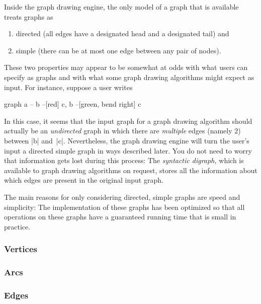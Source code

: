 Inside the graph drawing engine, the only model of a graph that is 
available treats graphs as
\begin{enumerate}
\item directed (all edges have a designated head and a designated
  tail) and
\item simple (there can be at most one edge between any pair of
  nodes). 
\end{enumerate}
These two properties may appear to be somewhat at odds with what users
can specify as graphs and with what some graph drawing algorithms
might expect as input. For instance, suppose a user writes
\begin{codeexample}
graph { a -- b --[red] c, b --[green, bend right] c }
\end{codeexample}
In this case, it seems that the input graph for a graph drawing
algorithm should actually be an \emph{undirected} graph in which there
are \emph{multiple} edges (namely $2$) between |b| and~|c|.
Nevertheless, the graph drawing engine will turn the user's input a
directed simple graph in ways described later. You do not need to
worry that information gets lost during this process: The
\emph{syntactic digraph,} which is available to graph drawing
algorithms on request, stores all the information about which edges
are present in the original input graph.

The main reasons for only considering directed, simple graphs are speed
and simplicity: The implementation of these graphs has been optimized so
that all operations on these graphs have a guaranteed running time
that is small in practice. 


\subsubsection{Vertices}


\subsubsection{Arcs}
\label{section-gd-arc-model}


\subsubsection{Edges}

